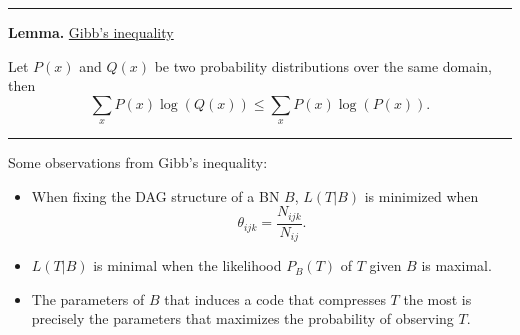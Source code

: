 \begin{center}\rule[0.5ex]{0.9\columnwidth}{1pt}\end{center}

\textbf{Lemma.} \underline{Gibb’s inequality}

Let $P(x)$ and $Q(x)$ be two probability distributions over the same domain, then
$$\sum_{x}P(x)\log(Q(x))\leq\sum_{x}P(x)\log(P(x)).$$

\begin{center}\rule[0.5ex]{0.9\columnwidth}{1pt}\end{center}

Some observations from Gibb’s inequality:

\begin{itemize}
	\item When fixing the DAG structure of a BN $B$, $L(T|B)$ is minimized when
	$$\theta_{ijk}=\frac{N_{ijk}}{N_{ij}}.$$
	
	\item $L(T|B)$ is minimal when the likelihood $P_{B}(T)$ of $T$ given $B$ is maximal. 
	
	\item The parameters of $B$ that induces a code that compresses $T$ the most is precisely the
parameters that maximizes the probability of observing $T$.
\end{itemize}
